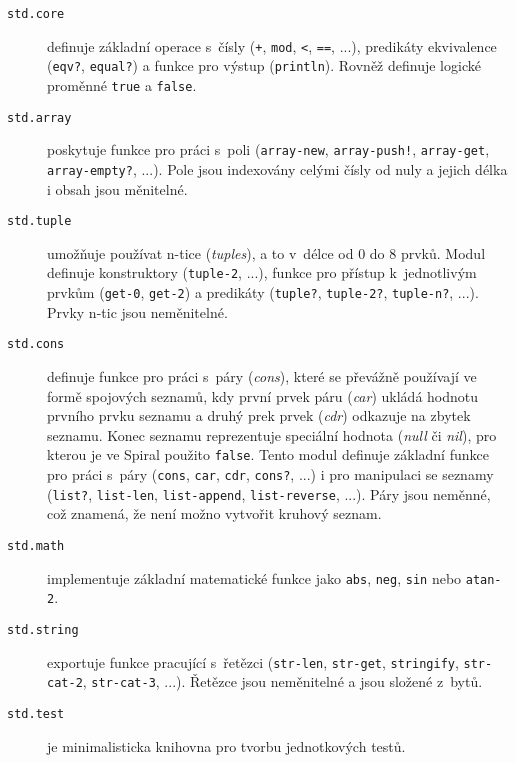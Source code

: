 \begin{description}
  \item[\texttt{std.core}] definuje základní operace s~čísly (\texttt{+},
    \texttt{mod}, \texttt{<}, \texttt{==}, ...), predikáty ekvivalence
    (\texttt{eqv?}, \texttt{equal?}) a funkce pro výstup (\texttt{println}).
    Rovněž definuje logické proměnné \texttt{true} a \texttt{false}.

  \item[\texttt{std.array}] poskytuje funkce pro práci s~poli
    (\texttt{array-new}, \texttt{array-push!}, \texttt{array-get},
    \texttt{array-empty?}, ...). Pole jsou indexovány celými čísly od nuly a
    jejich délka i obsah jsou měnitelné.

  \item[\texttt{std.tuple}] umožňuje používat n-tice (\emph{tuples}), a to
    v~délce od 0 do 8 prvků. Modul definuje konstruktory (\texttt{tuple-2},
    ...), funkce pro přístup k~jednotlivým prvkům (\texttt{get-0},
    \texttt{get-2}) a predikáty (\texttt{tuple?}, \texttt{tuple-2?},
    \texttt{tuple-n?}, ...). Prvky n-tic jsou neměnitelné.

  \item[\texttt{std.cons}] definuje funkce pro práci s~páry (\emph{cons}), které
    se převážně používají ve formě spojových seznamů, kdy první prvek páru
    (\emph{car}) ukládá hodnotu prvního prvku seznamu a druhý prek prvek
    (\emph{cdr}) odkazuje na zbytek seznamu. Konec seznamu reprezentuje
    speciální hodnota (\emph{null} či \emph{nil}), pro kterou je ve Spiral
    použito \texttt{false}. Tento modul definuje základní funkce pro práci
    s~páry (\texttt{cons}, \texttt{car}, \texttt{cdr}, \texttt{cons?}, ...) i
    pro manipulaci se seznamy (\texttt{list?}, \texttt{list-len},
    \texttt{list-append}, \texttt{list-reverse}, ...). Páry jsou neměnné, což
    znamená, že není možno vytvořit kruhový seznam.

  \item[\texttt{std.math}] implementuje základní matematické funkce jako
    \texttt{abs}, \texttt{neg}, \texttt{sin} nebo \texttt{atan-2}.

  \item[\texttt{std.string}] exportuje funkce pracující s~řetězci
    (\texttt{str-len}, \texttt{str-get}, \texttt{stringify}, \texttt{str-cat-2},
    \texttt{str-cat-3}, ...). Řetězce jsou neměnitelné a jsou složené z~bytů.

  \item[\texttt{std.test}] je minimalisticka knihovna pro tvorbu jednotkových
    testů.
\end{description}

